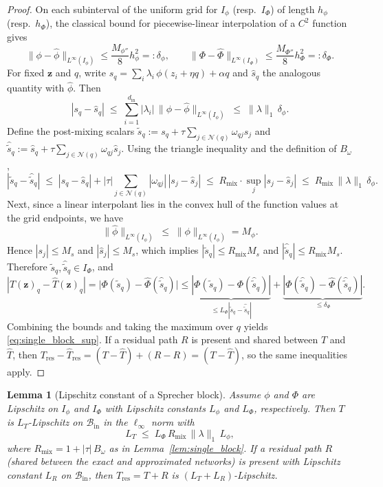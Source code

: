 \documentclass{article}
\theoremstyle{plain}
\newtheorem{lemma}{Lemma}
\theoremstyle{definition}
\theoremstyle{remark}
\begin{document}
\begin{proof}
On each subinterval of the uniform grid for $I_\phi$ (resp.\ $I_\Phi$) of length $h_\phi$ (resp.\ $h_\Phi$), the classical bound for piecewise-linear interpolation of a $C^2$ function gives
$$\|\phi-\hat\phi\|_{L^\infty(I_\phi)}\le \frac{M_{\phi''}}{8}h_\phi^2=:\delta_\phi,
\qquad
\|\Phi-\hat\Phi\|_{L^\infty(I_\Phi)}\le \frac{M_{\Phi''}}{8}h_\Phi^2=:\delta_\Phi.$$
For fixed $\mathbf{z}$ and $q$, write $s_q=\sum_i\lambda_i\,\phi(z_i+\eta q)+\alpha q$ and $\hat s_q$ the analogous quantity with $\hat\phi$. Then
$$|s_q-\hat s_q|\;\le\;\sum_{i=1}^{d_{\mathrm{in}}}|\lambda_i|\,\|\phi-\hat\phi\|_{L^\infty(I_\phi)}
\;\le\;\|\lambda\|_{1}\,\delta_\phi.$$
Define the post-mixing scalars $\tilde s_q:=s_q+\tau\sum_{j\in\mathcal{N}(q)}\omega_{qj}s_j$ and $\hat{\tilde s}_q:=\hat s_q+\tau\sum_{j\in\mathcal{N}(q)}\omega_{qj}\hat s_j$. Using the triangle inequality and the definition of $B_\omega$,
$$|\tilde s_q-\hat{\tilde s}_q|
\;\le\;
|s_q-\hat s_q| + |\tau| \sum_{j\in\mathcal{N}(q)}|\omega_{qj}|\,|s_j-\hat s_j|
\;\le\; R_{\mathrm{mix}}\cdot \sup_{j}|s_j-\hat s_j|
\;\le\; R_{\mathrm{mix}}\,\|\lambda\|_{1}\,\delta_\phi.$$
Next, since a linear interpolant lies in the convex hull of the function values at the grid endpoints, we have
$$\|\hat\phi\|_{L^\infty(I_\phi)} \;\le\; \|\phi\|_{L^\infty(I_\phi)}=M_\phi.$$
Hence $|s_j|\le M_s$ and $|\hat s_j|\le M_s$, which implies $|\tilde s_q|\le R_{\mathrm{mix}}M_s$ and $|\hat{\tilde s}_q|\le R_{\mathrm{mix}}M_s$. Therefore $\tilde s_q,\hat{\tilde s}_q\in I_\Phi$, and
$$|T(\mathbf{z})_q-\hat T(\mathbf{z})_q|
=\bigl|\Phi(\tilde s_q)-\hat\Phi(\hat{\tilde s}_q)\bigr|
\le \underbrace{|\Phi(\tilde s_q)-\Phi(\hat{\tilde s}_q)|}_{\le L_\Phi |\tilde s_q-\hat{\tilde s}_q|}
+ \underbrace{|\Phi(\hat{\tilde s}_q)-\hat\Phi(\hat{\tilde s}_q)|}_{\le \delta_\Phi}.$$
Combining the bounds and taking the maximum over $q$ yields \eqref{eq:single_block_sup}. If a residual path $R$ is present and shared between $T$ and $\hat T$, then $T_{\mathrm{res}}-\hat T_{\mathrm{res}}=(T-\hat T)+(R-R)=(T-\hat T)$, so the same inequalities apply.
\end{proof}

\begin{lemma}[Lipschitz constant of a Sprecher block]\label{lem:block_lip}
Assume $\phi$ and $\Phi$ are Lipschitz on $I_\phi$ and $I_\Phi$ with Lipschitz constants $L_\phi$ and $L_\Phi$, respectively. Then $T$ is $L_T$-Lipschitz on $\mathcal{B}_{\mathrm{in}}$ in the $\ell_\infty$ norm with
$$L_T \;\le\; L_\Phi\,R_{\mathrm{mix}}\,\|\lambda\|_1\,L_\phi,$$
where $R_{\mathrm{mix}}=1+|\tau|\,B_\omega$ as in Lemma~\ref{lem:single_block}. If a residual path $R$ (shared between the exact and approximated networks) is present with Lipschitz constant $L_R$ on $\mathcal{B}_{\mathrm{in}}$, then $T_{\mathrm{res}}=T+R$ is $(L_T+L_R)$-Lipschitz.
\end{lemma}
\end{document}
